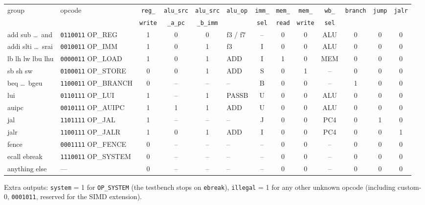 \documentclass[10pt]{article}
\newcommand{\sv}[1]{\texttt{#1}}
\begin{document}
\medskip
\begin{center}
\small
\begin{tabular}{l l c c c l c c c c c c c}
\toprule
group & opcode & \sv{reg\_} & \sv{alu\_src} & \sv{alu\_src} & \sv{alu\_op} & \sv{imm\_} & \sv{mem\_} & \sv{mem\_} & \sv{wb\_} & \sv{branch} & \sv{jump} & \sv{jalr}\\
      &        & \sv{write} & \sv{\_a\_pc} & \sv{\_b\_imm} &        & \sv{sel}  & \sv{read} & \sv{write} & \sv{sel} &  &  & \\
\midrule
add sub \dots\ and      & \sv{0110011} OP\_REG    & 1 & 0 & 0 & f3 / f7  & --  & 0 & 0 & ALU & 0 & 0 & 0\\
addi slti \dots\ srai   & \sv{0010011} OP\_IMM    & 1 & 0 & 1 & f3       & I   & 0 & 0 & ALU & 0 & 0 & 0\\
lb lh lw lbu lhu        & \sv{0000011} OP\_LOAD   & 1 & 0 & 1 & ADD      & I   & 1 & 0 & MEM & 0 & 0 & 0\\
sb sh sw                & \sv{0100011} OP\_STORE  & 0 & 0 & 1 & ADD      & S   & 0 & 1 & --  & 0 & 0 & 0\\
beq \dots\ bgeu         & \sv{1100011} OP\_BRANCH & 0 & --& --& --       & B   & 0 & 0 & --  & 1 & 0 & 0\\
lui                     & \sv{0110111} OP\_LUI    & 1 & --& 1 & PASSB    & U   & 0 & 0 & ALU & 0 & 0 & 0\\
auipc                   & \sv{0010111} OP\_AUIPC  & 1 & 1 & 1 & ADD      & U   & 0 & 0 & ALU & 0 & 0 & 0\\
jal                     & \sv{1101111} OP\_JAL    & 1 & --& --& --       & J   & 0 & 0 & PC4 & 0 & 1 & 0\\
jalr                    & \sv{1100111} OP\_JALR   & 1 & 0 & 1 & ADD      & I   & 0 & 0 & PC4 & 0 & 0 & 1\\
fence                   & \sv{0001111} OP\_FENCE  & 0 & --& --& --       & --  & 0 & 0 & --  & 0 & 0 & 0\\
ecall ebreak            & \sv{1110011} OP\_SYSTEM & 0 & --& --& --       & --  & 0 & 0 & --  & 0 & 0 & 0\\
anything else           & ---                     & 0 & --& --& --       & --  & 0 & 0 & --  & 0 & 0 & 0\\
\bottomrule
\end{tabular}
\end{center}
\noindent Extra outputs: \sv{system} = 1 for \sv{OP\_SYSTEM} (the testbench stops on \sv{ebreak}),
\sv{illegal} = 1 for any other unknown opcode (including custom-0, \sv{0001011}, reserved for the SIMD extension).
\end{document}
